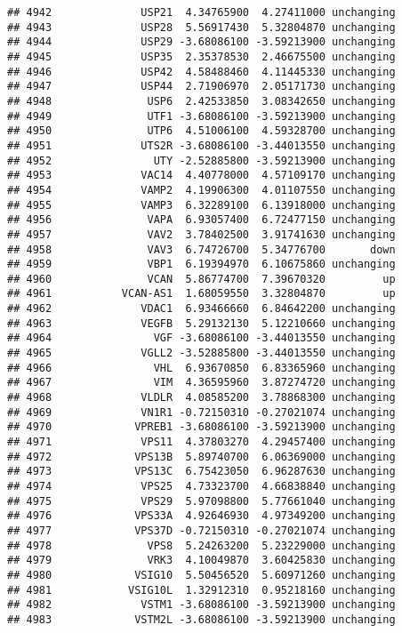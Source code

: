 \documentclass[]{article}
\begin{document}
\begin{verbatim}
## 4942              USP21  4.34765900  4.27411000 unchanging
## 4943              USP28  5.56917430  5.32804870 unchanging
## 4944              USP29 -3.68086100 -3.59213900 unchanging
## 4945              USP35  2.35378530  2.46675500 unchanging
## 4946              USP42  4.58488460  4.11445330 unchanging
## 4947              USP44  2.71906970  2.05171730 unchanging
## 4948               USP6  2.42533850  3.08342650 unchanging
## 4949               UTF1 -3.68086100 -3.59213900 unchanging
## 4950               UTP6  4.51006100  4.59328700 unchanging
## 4951              UTS2R -3.68086100 -3.44013550 unchanging
## 4952                UTY -2.52885800 -3.59213900 unchanging
## 4953              VAC14  4.40778000  4.57109170 unchanging
## 4954              VAMP2  4.19906300  4.01107550 unchanging
## 4955              VAMP3  6.32289100  6.13918000 unchanging
## 4956               VAPA  6.93057400  6.72477150 unchanging
## 4957               VAV2  3.78402500  3.91741630 unchanging
## 4958               VAV3  6.74726700  5.34776700       down
## 4959               VBP1  6.19394970  6.10675860 unchanging
## 4960               VCAN  5.86774700  7.39670320         up
## 4961           VCAN-AS1  1.68059550  3.32804870         up
## 4962              VDAC1  6.93466660  6.84642200 unchanging
## 4963              VEGFB  5.29132130  5.12210660 unchanging
## 4964                VGF -3.68086100 -3.44013550 unchanging
## 4965              VGLL2 -3.52885800 -3.44013550 unchanging
## 4966                VHL  6.93670850  6.83365960 unchanging
## 4967                VIM  4.36595960  3.87274720 unchanging
## 4968              VLDLR  4.08585200  3.78868300 unchanging
## 4969              VN1R1 -0.72150310 -0.27021074 unchanging
## 4970             VPREB1 -3.68086100 -3.59213900 unchanging
## 4971              VPS11  4.37803270  4.29457400 unchanging
## 4972             VPS13B  5.89740700  6.06369000 unchanging
## 4973             VPS13C  6.75423050  6.96287630 unchanging
## 4974              VPS25  4.73323700  4.66838840 unchanging
## 4975              VPS29  5.97098800  5.77661040 unchanging
## 4976             VPS33A  4.92646930  4.97349200 unchanging
## 4977             VPS37D -0.72150310 -0.27021074 unchanging
## 4978               VPS8  5.24263200  5.23229000 unchanging
## 4979               VRK3  4.10049870  3.60425830 unchanging
## 4980             VSIG10  5.50456520  5.60971260 unchanging
## 4981            VSIG10L  1.32912310  0.95218160 unchanging
## 4982              VSTM1 -3.68086100 -3.59213900 unchanging
## 4983             VSTM2L -3.68086100 -3.59213900 unchanging

\end{verbatim}
\end{document}
